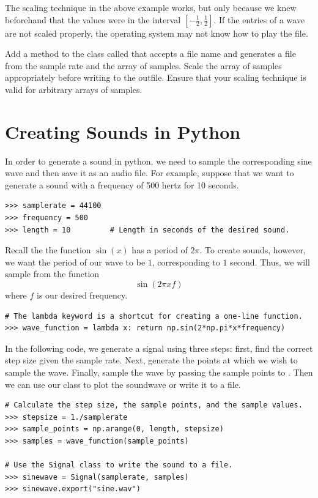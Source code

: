 The scaling technique in the above example works, but only because we knew beforehand that the values were in the interval $[-\frac{1}{2}, \frac{1}{2}]$.
If the entries of a wave are not scaled properly, the operating system may not know how to play the file.

\begin{problem}
Add a method to the  class called  that accepts a file name and generates a  file from the sample rate and the array of samples.
Scale the array of samples appropriately before writing to the outfile.
Ensure that your scaling technique is valid for arbitrary arrays of samples.
\end{problem}

\section*{Creating Sounds in Python}

In order to generate a sound in python, we need to sample the corresponding sine wave and then save it as an audio file.
For example, suppose that we want to generate a sound with a frequency of 500 hertz for 10 seconds.

\begin{lstlisting}
>>> samplerate = 44100
>>> frequency = 500
>>> length = 10         # Length in seconds of the desired sound.
\end{lstlisting}

Recall the the function $\sin(x)$ has a period of $2\pi$.
To create sounds, however, we want the period of our wave to be $1$, corresponding to $1$ second.
Thus, we will sample from the function
\[
\sin(2\pi xf)
\]
where $f$ is our desired frequency.

\begin{lstlisting}
# The lambda keyword is a shortcut for creating a one-line function.
>>> wave_function = lambda x: return np.sin(2*np.pi*x*frequency)
\end{lstlisting}

In the following code, we generate a signal using three steps: first, find the correct step size given the sample rate.
Next, generate the points at which we wish to sample the wave.
Finally, sample the wave by passing the sample points to .
Then we can use our  class to plot the soundwave or write it to a file.

\begin{lstlisting}
# Calculate the step size, the sample points, and the sample values.
>>> stepsize = 1./samplerate
>>> sample_points = np.arange(0, length, stepsize)
>>> samples = wave_function(sample_points)

# Use the Signal class to write the sound to a file.
>>> sinewave = Signal(samplerate, samples)
>>> sinewave.export("sine.wav")
\end{lstlisting}

